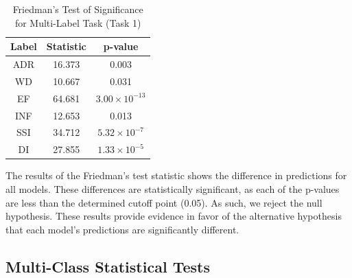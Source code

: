 \documentclass[10.7pt, onecolumn]{article}
\begin{document}
\begin{table}[H]
  \centering
  \small
  \begin{tabular}{|c|c|c|}
  \hline
  \textbf{Label} & \textbf{Statistic} & \textbf{p-value} \\ 
  \hline
  ADR & 16.373 & 0.003 \\ 
  \hline
  WD & 10.667 & 0.031 \\ 
  \hline
  EF & 64.681 & $3.00 \times 10^{-13}$ \\ 
  \hline
  INF & 12.653 & 0.013 \\ \hline
  SSI & 34.712 & $5.32 \times 10^{-7}$ \\ 
  \hline
  DI & 27.855 & $1.33 \times 10^{-5}$ \\ 
  \hline
  \end{tabular}
  \caption{Friedman's Test of Significance for Multi-Label Task (Task 1)}
  \label{tab:friedmansTest}
\end{table}

The results of the Friedman's test statistic shows the difference in predictions for all models. These differences are statistically significant, as each of the p-values are less than the determined cutoff point (0.05). As such, we reject the null hypothesis. These results provide evidence in favor of the alternative hypothesis that each model's predictions are significantly different.


\subsection{Multi-Class Statistical Tests}
\end{document}
